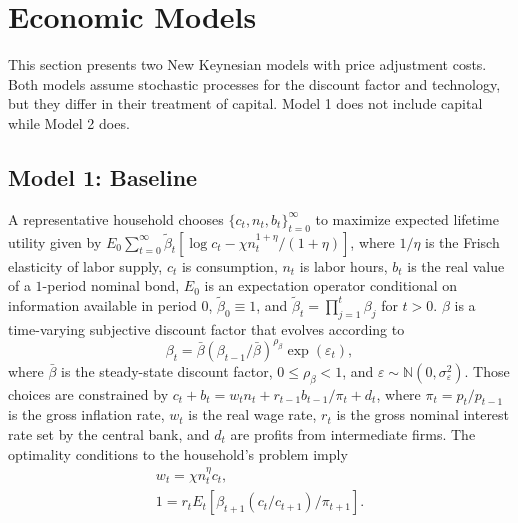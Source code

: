 \documentclass[12pt,final]{article}
\begin{document}
\section{Economic Models} \label{sec:models}

This section presents two New Keynesian models with \citet{Rotemberg1982} price adjustment costs. Both models assume stochastic processes for the discount factor and technology, but they differ in their treatment of capital. Model 1 does not include capital while Model 2 does.

\subsection{Model 1: Baseline}\label{sec:model1}

A representative household chooses $\{c_t,n_t,b_t\}_{t=0}^\infty$ to maximize expected lifetime utility given by $E_0\sum_{t=0}^\infty\tilde{\beta}_t[\log c_t-\chi n_t^{1+\eta}/(1+\eta)]$, where $1/\eta$ is the Frisch elasticity of labor supply, $c_t$ is consumption, $n_t$ is labor hours, $b_t$ is the real value of a $1$-period nominal bond, $E_0$ is an expectation operator conditional on information available in period $0$, $\tilde{\beta}_0\equiv1$, and $\tilde{\beta}_t=\prod_{j=1}^t \beta_j$ for $t>0$. $\beta$ is a time-varying subjective discount factor that evolves according to
\begin{equation}
\beta_t=\bar{\beta}(\beta_{t-1}/\bar{\beta})^{\rho_{\beta}}\exp(\varepsilon_t), \label{discount factor process}
\end{equation}
where $\bar{\beta}$ is the steady-state discount factor, $0\leq\rho_\beta<1$, and $\varepsilon\sim\mathbb{N}(0,\sigma_\varepsilon^2)$. Those choices are constrained by $c_t+b_t=w_tn_t+r_{t-1}b_{t-1}/\pi_t+d_t$, where $\pi_t=p_t/p_{t-1}$ is the gross inflation rate, $w_t$ is the real wage rate, $r_t$ is the gross nominal interest rate set by the central bank, and $d_t$ are profits from intermediate firms. The optimality conditions to the household's problem imply
\begin{gather}
w_t=\chi n_t^\eta c_t,  \label{FOC labor} \\
1= r_tE_t[\beta_{t+1}(c_t/c_{t+1})/\pi_{t+1}]. \label{bond euler1}
\end{gather}
\end{document}
